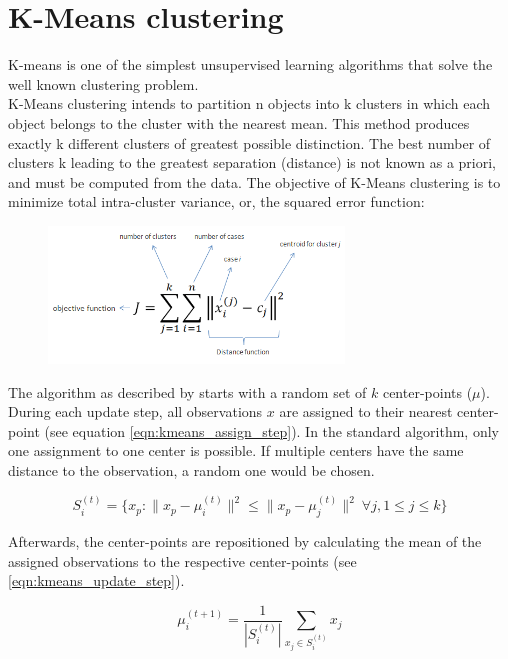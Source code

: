 \section{ K-Means clustering }\label{kmeans}
K-means \cite{kmeans} is one of the simplest unsupervised learning algorithms that solve the well known clustering problem. \\ K-Means clustering intends to partition n objects into k clusters in which each object belongs to the cluster with the nearest mean. This method produces exactly k different clusters of greatest possible distinction. The best number of clusters k leading to the greatest separation (distance) is not known as a priori,  and must be computed from the data. The objective of K-Means clustering is to minimize total intra-cluster variance, or, the squared error function:
\begin{figure}[H]
\centering
\includegraphics[width=0.7\textwidth]{img/ckmeans.png}
\end{figure}

 The algorithm as described by \cite{kmeans} starts with a random set of $k$ center-points ($\mu$). During each update step, all observations $x$ are assigned to their nearest center-point (see equation \ref{eqn:kmeans_assign_step}). In the standard algorithm, only one assignment to one center is possible. If multiple centers have the same distance to the observation, a random one would be chosen.

\begin{equation}
S_i^{(t)} = \big \{ x_p : \big \| x_p - \mu^{(t)}_i \big \|^2 \le \big \| x_p - \mu^{(t)}_j \big \|^2 \ \forall j, 1 \le j \le k \big\}
\label{eqn:kmeans_assign_step}
\end{equation}

Afterwards, the center-points are repositioned by calculating the mean of the assigned observations to the respective center-points (see \ref{eqn:kmeans_update_step}).

\begin{equation}
\mu^{(t+1)}_i = \frac{1}{|S^{(t)}_i|} \sum_{x_j \in S^{(t)}_i} x_j
\label{eqn:kmeans_update_step}
\end{equation}

